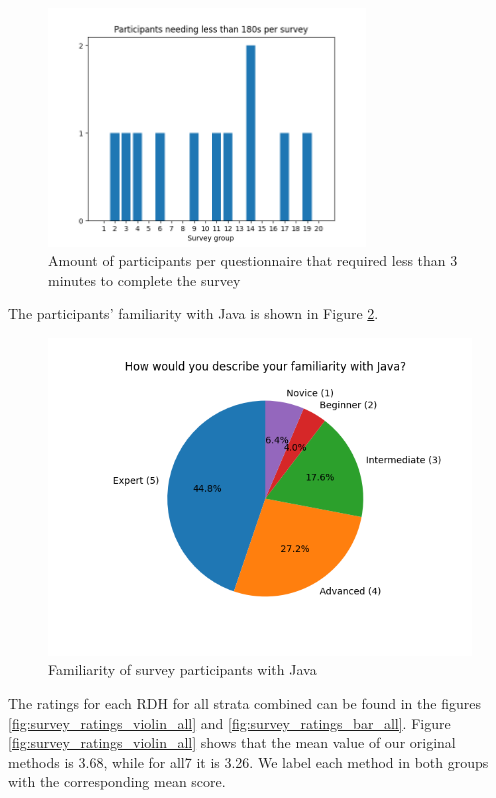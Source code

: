 \documentclass[%
class=scrreprt,
chapterprefix=false,%
open=right,%
twoside=false,%
paper=a4,%
logofile={Logo\_zentral\_farbig\_EN.png},%
thesistype=master,%
UKenglish,%
]{se2thesis}
\theoremstyle{definition}
\begin{document}
	\begin{figure}[t]
		\centering
		\includegraphics[width=0.75\textwidth]{img/survey_time_less_than_180.png}
		\caption{Amount of participants per questionnaire that required less than 3 minutes to complete the survey}
		\label{fig:survey_time_less_than_180}
	\end{figure}
	
	The participants' familiarity with Java is shown in Figure \ref{fig:survey_java_familiarity_pie}.
	
	\begin{figure}[t]
		\centering
		\includegraphics[width=\textwidth]{img/survey_java_familiarity_pie.png}
		\caption{Familiarity of survey participants with Java}
		\label{fig:survey_java_familiarity_pie}
	\end{figure}
	
	The ratings for each RDH for all strata combined can be found in the figures \ref{fig:survey_ratings_violin_all} and \ref{fig:survey_ratings_bar_all}. Figure \ref{fig:survey_ratings_violin_all} shows that the mean value of our original methods is 3.68, while for all7 it is 3.26. We label each method in both groups with the corresponding mean score.
	
\end{document}
